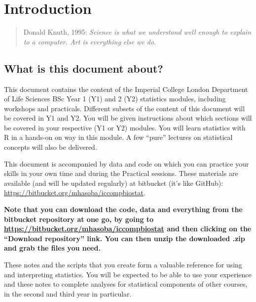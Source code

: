 \chapter{Introduction}

\begin{quote}{Donald Knuth, 1995: }
{\it Science is what we understand well enough to explain to a 
computer. Art is everything else we do.}
\end{quote}

\section{What is this document about?} 

\noindent This document contains the content of the Imperial College 
London Department of Life Sciences BSc Year 1 (Y1) and 2 (Y2) 
statistics modules, including workshops and practicals. Different 
subsets of the content of this document will be covered in Y1 and Y2. 
You will be given instructions about which sections will be covered in 
your respective (Y1 or Y2) modules. You will learn statistics with R in 
a hands-on on way in this module. A few ``pure'' lectures on statistical 
concepts will also be delivered. 

This document is accompanied by data and code on which you can practice 
your skills in your own time and during the Practical sessions. These 
materials are available (and will be updated regularly) at bitbucket 
(it's like GitHub): \url{https://bitbucket.org/mhasoba/iccompbiostat}.  

{\bf Note that you can download the code, data and everything 
from the bitbucket repository at one go, by going to 
\url{https://bitbucket.org/mhasoba/iccompbiostat}
and then clicking on the ``Download repository'' link. You can then unzip the 
downloaded .zip and grab the files you need.}

These notes and the scripts that you create form a valuable reference 
for using and interpreting statistics. You will be expected to be able 
to use your experience and these notes to complete analyses for 
statistical components of other courses, in the second and third year 
in particular.


